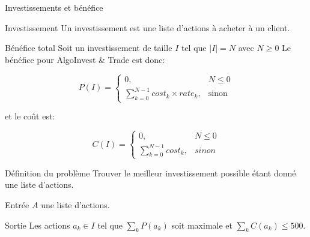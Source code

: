 \begin{frame}{Investissements et bénéfice}

  \begin{block}{Investissement}
    Un investissement est une liste d'actions à acheter à un client.
  \end{block}
  
  \begin{block}{Bénéfice total}
    Soit un investissement de taille $I$ tel que $|I| = N$ avec $N \ge 0$    
    Le bénéfice pour AlgoInvest \& Trade est donc:

    \begin{equation}
      P(I) =
      \begin{cases}
        0, & N \le 0 \\
        \sum _{k = 0}^{N - 1} cost_k \times rate_k, & \mbox{sinon}
      \end{cases}      
    \end{equation}

    et le coût est:
    
    \begin{equation}
      C(I) = 
      \begin{cases}
        0, & N \le 0 \\
        {\sum_{k = 0}^{N - 1} cost_k}, & sinon
      \end{cases}      
    \end{equation}
  \end{block}
\end{frame}

\begin{frame}{Définition du problème}
  Trouver le meilleur investissement possible étant donné une liste
  d'actions.

  \begin{block}{Entrée}
    $A$ une liste d'actions.
  \end{block}

  \begin{block}{Sortie}
    Les actions $a_k \in I$ tel que $\sum_k P(a_k)$ soit maximale
    et $\sum_k C(a_k) \le 500$.
  \end{block}
  
\end{frame}
